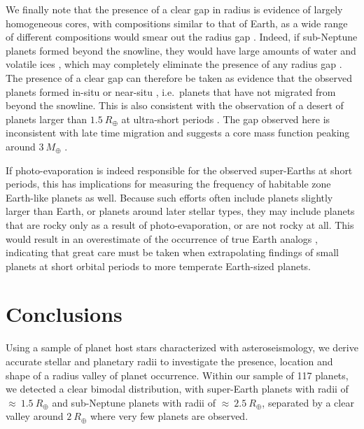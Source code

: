 \documentclass[a4paper,fleqn,usenatbib]{mnras}
\begin{document}
We finally note that the presence of a clear gap in radius is evidence of largely homogeneous cores, with compositions similar to that of Earth, as a wide range of different compositions would smear out the radius gap \citep{owen2017}. Indeed, if sub-Neptune planets formed beyond the snowline, they would have large amounts of water and volatile ices \citep{rogers2011}, which may completely eliminate the presence of any radius gap \citep{lopez2013}. The presence of a clear gap can therefore be taken as evidence that the observed planets formed in-situ or near-situ \citep[e.g.][]{chiang2013}, i.e.\ planets that have not migrated from beyond the snowline. This is also consistent with the observation of a desert of planets larger than $1.5~R_\oplus$ at ultra-short periods \citep{lundkvist2016,lopez2017}. The gap observed here is inconsistent with late time migration and suggests a core mass function peaking around $3~M_\oplus$ \citep{owen2017}.

If photo-evaporation is indeed responsible for the observed super-Earths at short periods, this has implications for measuring the frequency of habitable zone Earth-like planets as well. Because such efforts often include planets slightly larger than Earth, or planets around later stellar types, they may include planets that are rocky only as a result of photo-evaporation, or are not rocky at all. This would result in an overestimate of the occurrence of true Earth analogs \citep{lopez2016}, indicating that great care must be taken when extrapolating findings of small planets at short orbital periods to more temperate Earth-sized planets.

\section{Conclusions}
\label{sec:conclusions}

Using a sample of planet host stars characterized with asteroseismology, we derive accurate stellar and planetary radii to investigate the presence, location and shape of a radius valley of planet occurrence. Within our sample of 117 planets, we detected a clear bimodal distribution, with super-Earth planets with radii of $\approx~1.5~R_\oplus$ and sub-Neptune planets with radii of $\approx~2.5~R_\oplus$, separated by a clear valley around $2~R_\oplus$ where very few planets are observed. 
\end{document}
